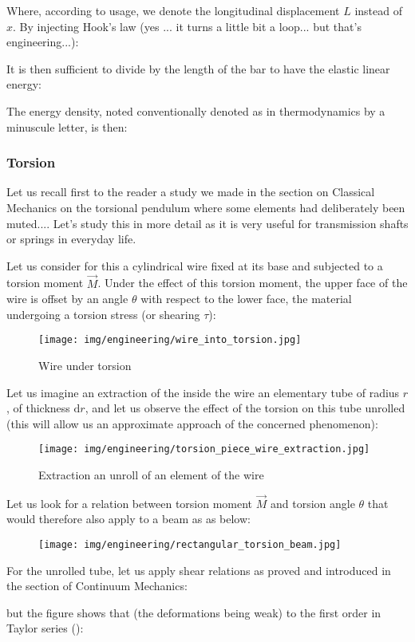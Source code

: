 	Where, according to usage, we denote the longitudinal displacement $L$ instead of $x$. By injecting Hook's law (yes ... it turns a little bit a loop... but that's engineering...):
	
	It is then sufficient to divide by the length of the bar to have the elastic linear energy:
	
	The energy density, noted conventionally denoted as in thermodynamics by a minuscule letter, is then:
	
	
	\pagebreak
	\subsubsection{Torsion}\label{torsion}
	Let us recall first to the reader a study we made in the section on Classical Mechanics on the torsional pendulum where some elements had deliberately been muted.... Let's study this in more detail as it is very useful for transmission shafts or springs in everyday life.

	Let us consider for this a cylindrical wire fixed at its base and subjected to a torsion moment $\vec{M}$. Under the effect of this torsion moment, the upper face of the wire is offset by an angle $\theta$ with respect to the lower face, the material undergoing a torsion stress (or shearing $\tau$):
	\begin{figure}[H]
		\centering
		\texttt{[image: img/engineering/wire\_into\_torsion.jpg]}
		\caption{Wire under torsion}
	\end{figure}
	Let us imagine an extraction of the inside the wire an elementary tube of radius $r$, of thickness $\mathrm{d}r$, and let us observe the effect of the torsion on this tube unrolled (this will allow us an approximate approach of the concerned phenomenon):
	\begin{figure}[H]
		\centering
		\texttt{[image: img/engineering/torsion\_piece\_wire\_extraction.jpg]}
		\caption[]{Extraction an unroll of an element of the wire}
	\end{figure}
	Let us look for a relation between torsion moment $\vec{M}$ and torsion angle $\theta$ that would therefore also apply to a beam as as below:
	\begin{figure}[H]
		\centering
		\texttt{[image: img/engineering/rectangular\_torsion\_beam.jpg]}
	\end{figure}
	For the unrolled tube, let us apply shear relations as proved and introduced in the section of Continuum Mechanics:
	
	but the figure shows that (the deformations being weak) to the first order in Taylor series ():
	
